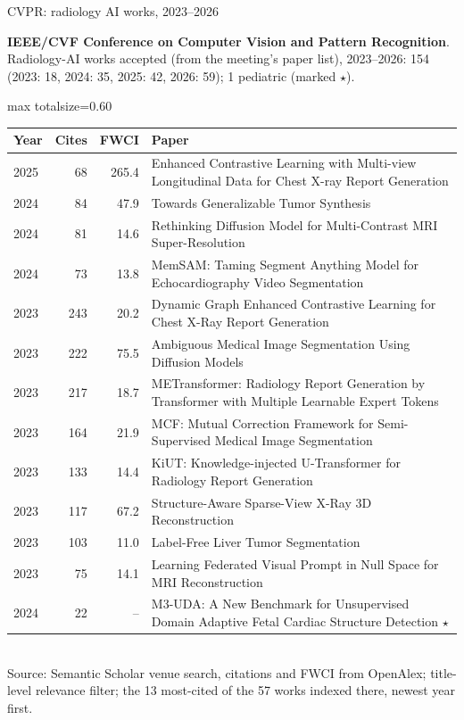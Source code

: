 \documentclass[aspectratio=169]{beamer}
\renewcommand{\arraystretch}{1.08}
\begin{document}
\begin{frame}[category=Conferences]{CVPR: radiology AI works, 2023--2026}
{\scriptsize \textbf{IEEE/CVF Conference on Computer Vision and Pattern Recognition}. Radiology-AI works accepted (from the meeting's paper list), 2023--2026: 154 (2023: 18, 2024: 35, 2025: 42, 2026: 59); 1 pediatric (marked $\star$).\par}\vspace{2pt}
\tiny
\begin{adjustbox}{max totalsize={\textwidth}{0.60\textheight}}
\renewcommand{\arraystretch}{1.2}
\begin{tabular}{|l|r|r|>{\raggedright\arraybackslash}p{}|}
\hline \textbf{Year} & \textbf{Cites} & \textbf{FWCI} & \textbf{Paper} \\ \hline
2025 & 68 & 265.4 & Enhanced Contrastive Learning with Multi-view Longitudinal Data for Chest X-ray Report Generation \\ \hline
2024 & 84 & 47.9 & Towards Generalizable Tumor Synthesis \\ \hline
2024 & 81 & 14.6 & Rethinking Diffusion Model for Multi-Contrast MRI Super-Resolution \\ \hline
2024 & 73 & 13.8 & MemSAM: Taming Segment Anything Model for Echocardiography Video Segmentation \\ \hline
2023 & 243 & 20.2 & Dynamic Graph Enhanced Contrastive Learning for Chest X-Ray Report Generation \\ \hline
2023 & 222 & 75.5 & Ambiguous Medical Image Segmentation Using Diffusion Models \\ \hline
2023 & 217 & 18.7 & METransformer: Radiology Report Generation by Transformer with Multiple Learnable Expert Tokens \\ \hline
2023 & 164 & 21.9 & MCF: Mutual Correction Framework for Semi-Supervised Medical Image Segmentation \\ \hline
2023 & 133 & 14.4 & KiUT: Knowledge-injected U-Transformer for Radiology Report Generation \\ \hline
2023 & 117 & 67.2 & Structure-Aware Sparse-View X-Ray 3D Reconstruction \\ \hline
2023 & 103 & 11.0 & Label-Free Liver Tumor Segmentation \\ \hline
2023 & 75 & 14.1 & Learning Federated Visual Prompt in Null Space for MRI Reconstruction \\ \hline
2024 & 22 & -- & M3-UDA: A New Benchmark for Unsupervised Domain Adaptive Fetal Cardiac Structure Detection $\star$ \\ \hline
\end{tabular}
\end{adjustbox}
\\[2pt]
{\tiny Source: Semantic Scholar venue search, citations and FWCI from OpenAlex; title-level relevance filter; the 13 most-cited of the 57 works indexed there, newest year first.}
\end{frame}
\end{document}
